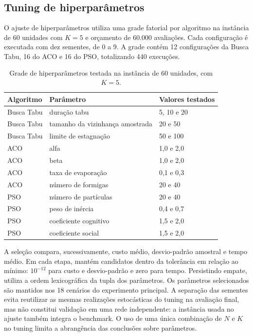 \documentclass[12pt,a4paper]{article}
\begin{document}
\subsection{Tuning de hiperparâmetros}
\label{subsec:tuning}

O ajuste de hiperparâmetros utiliza uma grade fatorial por algoritmo na instância de 60
unidades com $K=5$ e orçamento de 60.000 avaliações. Cada configuração é executada com
dez sementes, de 0 a 9. A grade contém 12 configurações da Busca Tabu, 16 do ACO e 16 do
PSO, totalizando 440 execuções.

\begin{table}[htbp]
\centering\small
\caption{Grade de hiperparâmetros testada na instância de 60 unidades, com $K=5$.}
\label{tab:grade-tuning}
\begin{tabularx}{\textwidth}{lYY}
\toprule
Algoritmo & Parâmetro & Valores testados \\
\midrule
Busca Tabu & duração tabu & 5, 10 e 20 \\
Busca Tabu & tamanho da vizinhança amostrada & 20 e 50 \\
Busca Tabu & limite de estagnação & 50 e 100 \\
ACO & alfa & 1,0 e 2,0 \\
ACO & beta & 1,0 e 2,0 \\
ACO & taxa de evaporação & 0,1 e 0,3 \\
ACO & número de formigas & 20 e 40 \\
PSO & número de partículas & 20 e 40 \\
PSO & peso de inércia & 0,4 e 0,7 \\
PSO & coeficiente cognitivo & 1,5 e 2,0 \\
PSO & coeficiente social & 1,5 e 2,0 \\
\bottomrule
\end{tabularx}
\end{table}

A seleção compara, sucessivamente, custo médio, desvio-padrão amostral e tempo médio. Em
cada etapa, mantém candidatos dentro da tolerância em relação ao mínimo: $10^{-12}$ para
custo e desvio-padrão e zero para tempo. Persistindo empate, utiliza a ordem
lexicográfica da tupla dos parâmetros. Os parâmetros selecionados são mantidos nos 18
cenários do experimento principal. A separação das sementes evita reutilizar as mesmas
realizações estocásticas do tuning na avaliação final, mas não constitui validação em
uma rede independente: a instância usada no ajuste também integra o benchmark. O uso de
uma única combinação de $N$ e $K$ no tuning limita a abrangência das conclusões sobre
parâmetros.
\end{document}
